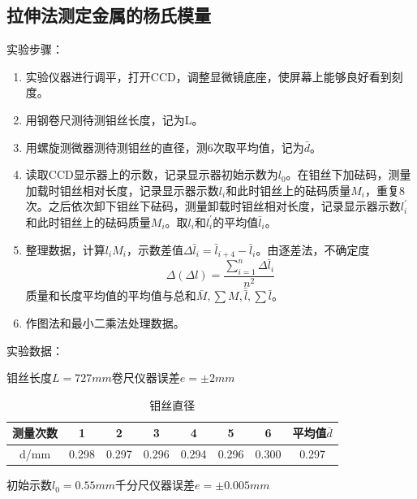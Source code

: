 \documentclass[11pt]{article}
\begin{document}
\subsection{拉伸法测定金属的杨氏模量}
\noindent 实验步骤：
\begin{enumerate}
    \item 实验仪器进行调平，打开CCD，调整显微镜底座，使屏幕上能够良好看到刻度。
    \item 用钢卷尺测待测钼丝长度，记为L。
    \item 用螺旋测微器测待测钼丝的直径，测6次取平均值，记为$\bar{d}$。
    \item 读取CCD显示器上的示数，记录显示器初始示数为$l_0$。在钼丝下加砝码，测量加载时钼丝相对长度，记录显示器示数$l_i$和此时钼丝上的砝码质量$M_i$，重复8次。之后依次卸下钼丝下砝码，测量卸载时钼丝相对长度，记录显示器示数${l}_i^'$和此时钼丝上的砝码质量$M_i$。取$l_i$和${l}_i^'$的平均值$\bar{l}_i$。
    \item 整理数据，计算$l_i M_i$，示数差值$\Delta \bar{l}_i=\bar{l}_{i+4}-\bar{l}_i$。由逐差法，不确定度
    \[\Delta(\Delta l)=\frac{\sum_{i = 1}^{n} \Delta \bar{l}_i }{n^2}\]
    质量和长度平均值的平均值与总和$\bar{M},\sum M,\bar{\bar{l}}, \sum \bar{l}$。
    \item 作图法和最小二乘法处理数据。
\end{enumerate}
\noindent 实验数据：
    \par \hspace*{2em}钼丝长度$L=727mm$\qquad 卷尺仪器误差$e=\pm 2mm$
\begin{table}[H]
    \centering
    \caption{钼丝直径}
    \begin{tabular}{|c|c|c|c|c|c|c|c|}
    \hline
        测量次数 & 1 & 2 & 3 & 4 & 5 & 6 & 平均值$\bar{d}$\\ \hline
        d/mm & 0.298  & 0.297  & 0.296  & 0.294  & 0.296  & 0.300 &0.297 \\ \hline
    \end{tabular}
\end{table}
    \par \hspace*{2em}初始示数$l_0=0.55mm$\qquad 千分尺仪器误差$e=\pm 0.005mm$
\end{document}
